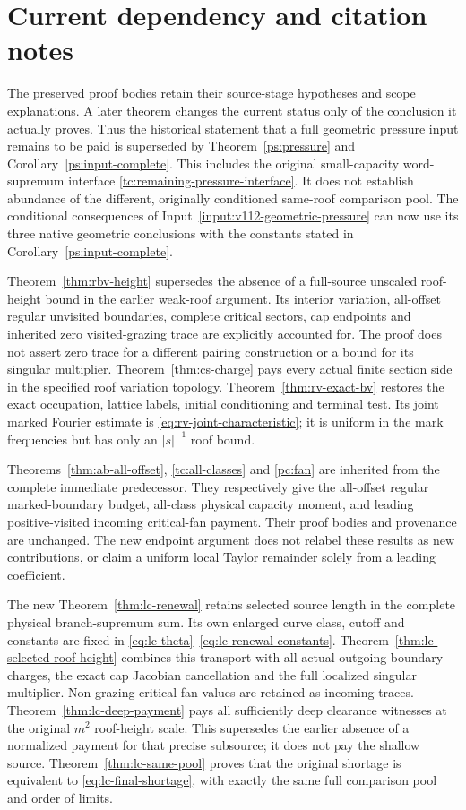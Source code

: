 \section{Current dependency and citation notes}
\label{sec:current-dependencies}
The preserved proof bodies retain their source-stage hypotheses
and scope explanations. A later theorem changes the current status
only of the conclusion it actually proves. Thus the historical
statement that a full geometric pressure input remains to be paid
is superseded by Theorem~\ref{ps:pressure} and
Corollary~\ref{ps:input-complete}. This includes the original
small-capacity word-supremum interface
\eqref{tc:remaining-pressure-interface}. It does not establish
abundance of the different, originally conditioned same-roof
comparison pool. The conditional consequences of
Input~\ref{input:v112-geometric-pressure} can now use its three
native geometric conclusions with the constants stated in
Corollary~\ref{ps:input-complete}.

Theorem~\ref{thm:rbv-height} supersedes the absence of a full-source
unscaled roof-height bound in the earlier weak-roof argument. Its
interior variation, all-offset regular unvisited boundaries,
complete critical sectors, cap endpoints and inherited zero
visited-grazing trace are explicitly accounted for. The proof does
not assert zero trace for a different pairing construction or a
bound for its singular multiplier. Theorem~\ref{thm:cs-charge}
pays every actual finite section side in the specified roof
variation topology. Theorem~\ref{thm:rv-exact-bv} restores the
exact occupation, lattice labels, initial conditioning and
terminal test. Its joint marked Fourier estimate is
\eqref{eq:rv-joint-characteristic}; it is uniform in the mark
frequencies but has only an $|s|^{-1}$ roof bound.

Theorems~\ref{thm:ab-all-offset}, \ref{tc:all-classes} and
\ref{pc:fan} are inherited from the complete immediate predecessor.
They respectively give the all-offset regular marked-boundary
budget, all-class physical capacity moment, and leading
positive-visited incoming critical-fan payment. Their proof bodies
and provenance are unchanged. The new endpoint argument does not
relabel these results as new contributions, or claim a uniform
local Taylor remainder solely from a leading coefficient.

The new Theorem~\ref{thm:lc-renewal} retains selected source length
in the complete physical branch-supremum sum. Its own enlarged
curve class, cutoff and constants are fixed in
\eqref{eq:lc-theta}--\eqref{eq:lc-renewal-constants}.
Theorem~\ref{thm:lc-selected-roof-height} combines this transport
with all actual outgoing boundary charges, the exact cap
Jacobian cancellation and the full localized singular multiplier.
Non-grazing critical fan values are retained as incoming traces.
Theorem~\ref{thm:lc-deep-payment} pays all sufficiently deep
clearance witnesses at the original $m^2$ roof-height scale.
This supersedes the earlier absence of a normalized payment for
that precise subsource; it does not pay the shallow source.
Theorem~\ref{thm:lc-same-pool} proves that the original shortage
is equivalent to \eqref{eq:lc-final-shortage}, with exactly the
same full comparison pool and order of limits.

